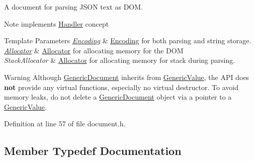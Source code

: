 A document for parsing J\+S\+ON text as D\+OM. 

\begin{DoxyNote}{Note}
implements \mbox{\hyperlink{classrapidjson_1_1_handler}{Handler}} concept 
\end{DoxyNote}

\begin{DoxyTemplParams}{Template Parameters}
{\em \mbox{\hyperlink{classrapidjson_1_1_encoding}{Encoding}}} & \mbox{\hyperlink{classrapidjson_1_1_encoding}{Encoding}} for both parsing and string storage. \\
\hline
{\em \mbox{\hyperlink{classrapidjson_1_1_allocator}{Allocator}}} & \mbox{\hyperlink{classrapidjson_1_1_allocator}{Allocator}} for allocating memory for the D\+OM \\
\hline
{\em Stack\+Allocator} & \mbox{\hyperlink{classrapidjson_1_1_allocator}{Allocator}} for allocating memory for stack during parsing. \\
\hline
\end{DoxyTemplParams}
\begin{DoxyWarning}{Warning}
Although \mbox{\hyperlink{classrapidjson_1_1_generic_document}{Generic\+Document}} inherits from \mbox{\hyperlink{classrapidjson_1_1_generic_value}{Generic\+Value}}, the A\+PI does {\bfseries{not}} provide any virtual functions, especially no virtual destructor. To avoid memory leaks, do not {\ttfamily delete} a \mbox{\hyperlink{classrapidjson_1_1_generic_document}{Generic\+Document}} object via a pointer to a \mbox{\hyperlink{classrapidjson_1_1_generic_value}{Generic\+Value}}. 
\end{DoxyWarning}


Definition at line 57 of file document.\+h.



\subsection{Member Typedef Documentation}
\mbox{\label{classrapidjson_1_1_generic_document_a4c85243a28c9dcf2d1357da00fcaa773}} 
